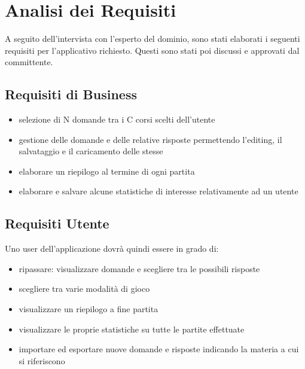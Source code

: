 

\chapter{Analisi dei Requisiti}
A seguito dell'intervista con l'esperto del dominio, sono stati elaborati i seguenti requisiti per l'applicativo richiesto. Questi sono stati poi discussi e approvati dal committente.
	\section{Requisiti di Business}
	\begin{itemize}
        \item selezione di N domande tra i C corsi scelti dell'utente
        \item gestione delle domande e delle relative risposte permettendo l'editing, il salvataggio e il caricamento delle stesse
        \item elaborare un riepilogo al termine di ogni partita
        \item elaborare e salvare alcune statistiche di interesse relativamente ad un utente
    \end{itemize}
	
	\section{Requisiti Utente}
    Uno user dell'applicazione dovrà quindi essere in grado di:
    \begin{itemize}
        \item ripassare: visualizzare domande e scegliere tra le possibili risposte
        \item scegliere tra varie modalità di gioco
        \item visualizzare un riepilogo a fine partita
        \item visualizzare le proprie statistiche su tutte le partite effettuate
        \item importare ed esportare nuove domande e risposte indicando la materia a cui si riferiscono
    \end{itemize}
 
